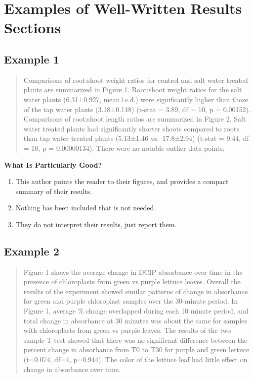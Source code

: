 \documentclass[
]{book}
\providecommand{\tightlist}{%
  \setlength{\itemsep}{0pt}\setlength{\parskip}{0pt}}
\begin{document}
\hypertarget{examples-of-well-written-results-sections}{%
\section{Examples of Well-Written Results Sections}\label{examples-of-well-written-results-sections}}

\hypertarget{example-1-7}{%
\subsection{Example 1}\label{example-1-7}}

\begin{quote}
Comparisons of root:shoot weight ratios for control and salt water treated plants are summarized in Figure 1. Root:shoot weight ratios for the salt water plants (6.31±0.927, mean±s.d.) were significantly higher than those of the tap water plants (3.18±0.148) (t-stat = 3.89, df = 10, p = 0.00152). Comparisons of root:shoot length ratios are summarized in Figure 2. Salt water treated plants had significantly shorter shoots compared to roots than tap water treated plants (5.13±1.46 vs.~17.8±2.94) (t-stat = 9.44, df = 10, p = 0.00000134). There were no notable outlier data points.
\end{quote}

\textbf{What Is Particularly Good?}

\begin{enumerate}
\def\labelenumi{\arabic{enumi}.}
\tightlist
\item
  This author points the reader to their figures, and provides a compact summary of their results.
\item
  Nothing has been included that is not needed.
\item
  They do not interpret their results, just report them.
\end{enumerate}

\hypertarget{example-2-7}{%
\subsection{Example 2}\label{example-2-7}}

\begin{quote}
Figure 1 shows the average change in DCIP absorbance over time in the presence of chloroplasts from green vs purple lettuce leaves. Overall the results of the experiment showed similar patterns of change in absorbance for green and purple chloroplast samples over the 30-minute period. In Figure 1, average \% change overlapped during each 10 minute period, and total change in absorbance at 30 minutes was about the same for samples with chloroplasts from green vs purple leaves. The results of the two sample T-test showed that there was no significant difference between the percent change in absorbance from T0 to T30 for purple and green lettuce (t=0.074, df=4, p=0.944). The color of the lettuce leaf had little effect on change in absorbance over time.
\end{quote}
\end{document}
